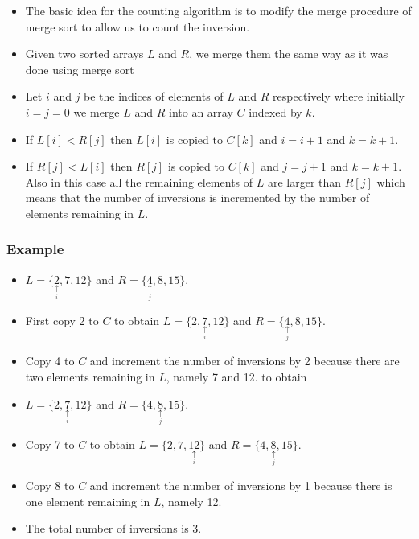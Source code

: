 \documentclass{beamer}
\begin{document}
\begin{frame}
  \begin{itemize}  \item The basic idea for the counting algorithm is to modify the merge procedure of merge sort to allow us to count the inversion.
  \item Given two sorted arrays $L$ and $R$, we merge them the same way as it was done using merge sort
\item Let $i$ and $j$ be the indices of elements of $L$ and $R$ respectively where initially $i=j=0$ we merge $L$ and $R$ into an array $C$ indexed
   by $k$.
 \item If $L[i]<R[j]$ then $L[i]$ is copied to $C[k]$ and $i=i+1$ and $k=k+1$.
 \item If $R[j]<L[i]$ then $R[j]$ is copied to $C[k]$ and $j=j+1$ and $k=k+1$. Also in this case all the remaining elements of $L$ are
larger than $R[j]$ which means that the number of inversions is incremented by the number of elements remaining in $L$.
\end{itemize}

\end{frame}

\begin{frame}
\frametitle{Example}
\begin{itemize}
\item  $L=\{\underset{\underset{i}{\uparrow}}{2},7,12\}$ and $R=\{\underset{\underset{j}{\uparrow}}{4},8,15\}$. 
\item First copy 2 to $C$ to obtain $L=\{2,\underset{\underset{i}{\uparrow}}{7},12\}$ and $R=\{\underset{\underset{j}{\uparrow}}{4},8,15\}$. 
\item Copy 4 to $C$ and increment the number of inversions by 2 because there are two elements remaining in $L$, namely 7 and 12. to obtain
\item  $L=\{2,\underset{\underset{i}{\uparrow}}{7},12\}$ and $R=\{4,\underset{\underset{j}{\uparrow}}{8},15\}$. 
\item Copy 7 to $C$ to obtain $L=\{2,7,\underset{\underset{i}{\uparrow}}{12}\}$ and $R=\{4,\underset{\underset{j}{\uparrow}}{8},15\}$. 
\item Copy 8 to $C$ and increment the number of inversions by 1 because there is one element remaining in $L$, namely 12.
\item The total number of inversions is 3.

  \end{itemize}
\end{frame}
\end{document}
